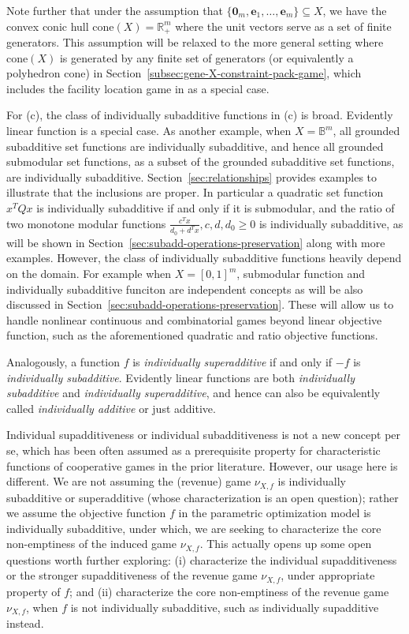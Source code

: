\documentclass[11pt]{article}\usepackage[]{graphicx}\usepackage[]{xcolor}
\begin{document}
Note further that under the assumption that $\{\mathbf{0}_m, \mathbf{e}_1,\dots, \mathbf{e}_m\}\subseteq X$, we have the convex conic hull $\text{cone} (X)=\mathbb{R}^m_{+}$ where the unit vectors serve as a set of finite generators. This assumption will be relaxed to the more general setting where $\text{cone} (X)$ is generated by any finite set of generators (or equivalently a polyhedron cone) in Section~\ref{subsec:gene-X-constraint-pack-game}, which includes the facility location game in \citep{goemans2004cooperative} as a special case. 

For (c), the class of individually subadditive functions in (c) is broad. Evidently linear function is a special case. As another example, when $X=\mathbb{B}^m$, all grounded subadditive set functions are individually subadditive, and hence all grounded submodular set functions, as a subset of the grounded subadditive set functions, are individually subadditive. Section~\ref{sec:relationships} provides examples to illustrate that the inclusions are proper. In particular a quadratic set function $x^TQx$ is individually subadditive if and only if it is submodular, and the ratio of two monotone modular functions $\frac{c^Tx}{d_0+d^Tx}, c, d, d_0\ge 0$ is individually subadditive, as will be shown in Section~\ref{sec:subadd-operations-preservation} along with more examples. However, the class of individually subadditive functions heavily depend on the domain. For example when $X=[0,1]^m$, submodular function and individually subadditive funciton are independent concepts as will be also discussed in Section~\ref{sec:subadd-operations-preservation}.  These will allow us to handle nonlinear continuous and combinatorial games beyond linear objective function, such as  the aforementioned quadratic and ratio objective functions.



Analogously, a function $f$ is \emph{individually superadditive} if and only if $-f$ is \emph{individually subadditive}. Evidently linear functions are both \emph{individually subadditive} and \emph{individually superadditive}, and hence can also be equivalently called \emph{individually additive} or just additive. 



Individual supadditiveness or individual subadditiveness is not a new concept per se, which has been often assumed as a prerequisite property for characteristic functions of cooperative games in the prior literature. However, our usage here is different. We are not assuming the (revenue) game $\nu_{X,f}$ is individually subadditive or superadditive (whose characterization is an open question); rather we assume the objective function $f$ in the parametric optimization model is individually subadditive, under which, we are seeking to characterize the core non-emptiness of the induced game $\nu_{X,f}$. This actually opens up some open questions worth further exploring: (i) characterize the individual supadditiveness or the stronger supadditiveness of the revenue game $\nu_{X,f}$, under appropriate property of $f$; and (ii) characterize the core non-emptiness of the revenue game $\nu_{X,f}$, when $f$ is not individually subadditive, such as individually supadditive instead. 
\end{document}
